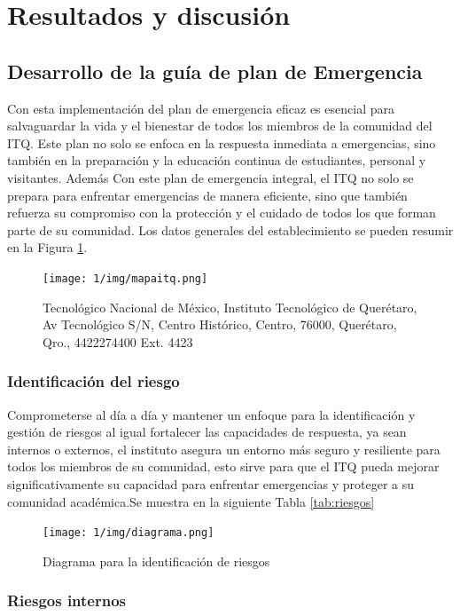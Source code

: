     \section{Resultados y discusión}
    
    \subsection{Desarrollo de la guía de plan de Emergencia}
    
    Con esta implementación del plan de emergencia eficaz es esencial para salvaguardar la vida y el bienestar de todos los miembros de la comunidad del ITQ. Este plan no solo se enfoca en la respuesta inmediata a emergencias, sino también en la preparación y la educación continua de estudiantes, personal y visitantes. Además Con este plan de emergencia integral, el ITQ no solo se prepara para enfrentar emergencias de manera eficiente, sino que también refuerza su compromiso con la protección y el cuidado de todos los que forman parte de su comunidad.
    Los datos generales del establecimiento se pueden resumir en la Figura \ref{fig:mapa itq}.
    \begin{figure}[H]
        \centering
        \texttt{[image: 1/img/mapaitq.png]}
        \caption{Tecnológico Nacional de México, Instituto Tecnológico de Querétaro, Av Tecnológico S/N, Centro Histórico, Centro, 76000, Querétaro, Qro., 4422274400 Ext. 4423}
        \label{fig:mapa itq}
    \end{figure}
    \subsubsection{Identificación del riesgo}
    Comprometerse al día a día y mantener un enfoque para la identificación y gestión de riesgos al igual fortalecer las capacidades de respuesta, ya sean internos o externos, el instituto asegura un entorno más seguro y resiliente para todos los miembros de su comunidad, esto sirve para que el ITQ pueda mejorar significativamente su capacidad para enfrentar emergencias y proteger a su comunidad académica.Se muestra en la siguiente Tabla \ref{tab:riesgos}
    \begin{figure}[H]
        \centering
        \texttt{[image: 1/img/diagrama.png]}
        \caption{Diagrama para la identificación de riesgos}
        \label{fig:diagrama}
    \end{figure}
    \subsubsection{Riesgos internos}
    
